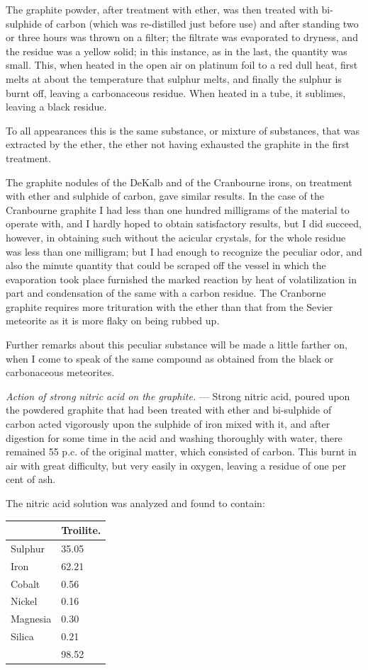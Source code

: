 \documentclass[a4paper, 11pt, oneside, english]{article}
\begin{document}
The graphite powder, after treatment with ether, was then treated with bi-sulphide of carbon (which was re-distilled just before use) and after standing two or three hours was thrown on a filter; the filtrate was evaporated to dryness, and the residue was a yellow solid; in this instance, as in the last, the quantity was small. This, when heated in the open air on platinum foil to a red dull heat, first melts at about the temperature that sulphur melts, and finally the sulphur is burnt off, leaving a carbonaceous residue. When heated in a tube, it sublimes, leaving a black residue.

To all appearances this is the same substance, or mixture of substances, that was extracted by the ether, the ether not having exhausted the graphite in the first treatment.

The graphite nodules of the DeKalb and of the Cranbourne irons, on treatment with ether and sulphide of carbon, gave similar results. In the case of the Cranbourne graphite I had less than one hundred milligrams of the material to operate with, and I hardly hoped to obtain satisfactory results, but I did succeed, however, in obtaining such without the acicular crystals, for the whole residue was less than one milligram; but I had enough to recognize the peculiar odor, and also the minute quantity that could be scraped off the vessel in which the evaporation took place furnished the marked reaction by heat of volatilization in part and condensation of the same with a carbon residue. The Cranborne graphite requires more trituration with the ether than that from the Sevier meteorite as it is more flaky on being rubbed up.

Further remarks about this peculiar substance will be made a little farther on, when I come to speak of the same compound as obtained from the black or carbonaceous meteorites.

\emph{Action of strong nitric acid on the graphite.} --- Strong nitric acid, poured upon the powdered graphite that had been treated with ether and bi-sulphide of carbon acted vigorously upon the sulphide of iron mixed with it, and after digestion for some time in the acid and washing thoroughly with water, there remained 55 p.c. of the original matter, which consisted of carbon. This burnt in air with great difficulty, but very easily in oxygen, leaving a residue of one per cent of ash.

The nitric acid solution was analyzed and found to contain:
\begin{table}[H]
    \centering
    \begin{tabular}{|l|l|}
    \hline
        ~ & Troilite. \\ \hline
        Sulphur & 35.05 \\ \hline
        Iron & 62.21 \\ \hline
        Cobalt & 0.56 \\ \hline
        Nickel & 0.16 \\ \hline
        Magnesia & 0.30 \\ \hline
        Silica & 0.21 \\ \hline
        ~ & 98.52 \\ \hline
    \end{tabular}
\end{table}
\end{document}
